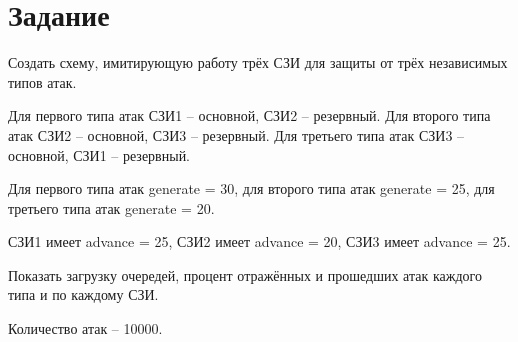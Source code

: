 \section{Задание}

Создать схему, имитирующую работу трёх СЗИ для защиты от трёх независимых типов атак. 

Для первого типа атак СЗИ1 – основной, СЗИ2 – резервный. Для второго типа атак СЗИ2 – основной, СЗИ3 – резервный. Для третьего типа атак СЗИ3 – основной, СЗИ1 – резервный. 

Для первого типа атак generate = 30, для второго типа атак generate = 25, для третьего типа атак generate = 20. 

СЗИ1 имеет advance = 25, СЗИ2 имеет advance = 20, СЗИ3 имеет advance = 25. 

Показать загрузку очередей, процент отражённых и прошедших атак каждого типа и по каждому СЗИ. 

Количество атак – 10000.